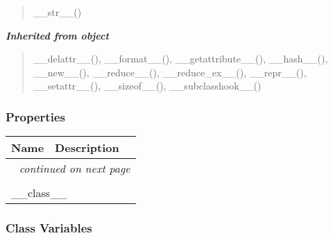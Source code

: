 \begin{quote}
\_\_str\_\_()
\end{quote}

\large{\textbf{\textit{Inherited from object}}}

\begin{quote}
\_\_delattr\_\_(), \_\_format\_\_(), \_\_getattribute\_\_(), \_\_hash\_\_(), \_\_new\_\_(), \_\_reduce\_\_(), \_\_reduce\_ex\_\_(), \_\_repr\_\_(), \_\_setattr\_\_(), \_\_sizeof\_\_(), \_\_subclasshook\_\_()
\end{quote}


  \subsubsection{Properties}

    \vspace{-1cm}
\hspace{\varindent}\begin{longtable}{|p{\varnamewidth}|p{\vardescrwidth}|l}
\cline{1-2}
\cline{1-2} \centering \textbf{Name} & \centering \textbf{Description}& \\
\cline{1-2}
\endhead\cline{1-2}\multicolumn{3}{r}{\small\textit{continued on next page}}\\\endfoot\cline{1-2}
\endlastfoot\multicolumn{2}{|l|}{\textit{Inherited from object}}\\
\multicolumn{2}{|p{\varwidth}|}{\raggedright \_\_class\_\_}\\
\cline{1-2}
\end{longtable}



  \subsubsection{Class Variables}

